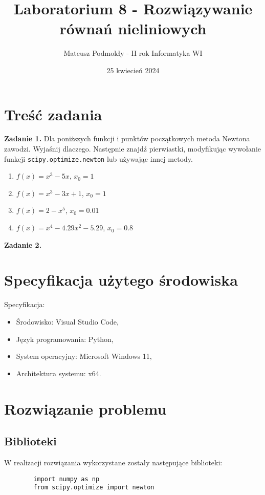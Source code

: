 \documentclass[11pt, leqno]{scrartcl}
\title{Laboratorium 8 - Rozwiązywanie równań nieliniowych}
\author{Mateusz Podmokły - II rok Informatyka WI}
\date{25 kwiecień 2024}
\begin{document}
    \maketitle
    \section{Treść zadania}
    \textbf{Zadanie 1.} Dla poniższych funkcji i punktów początkowych
    metoda Newtona zawodzi. Wyjaśnij dlaczego. Następnie znajdź
    pierwiastki, modyfikując wywołanie funkcji
    \texttt{scipy.optimize.newton} lub używając innej metody.
    \begin{enumerate}
        \item $f(x)=x^3-5x$, $x_0=1$
        \item $f(x)=x^3-3x+1$, $x_0=1$
        \item $f(x)=2-x^5$, $x_0=0.01$
        \item $f(x)=x^4-4.29x^2-5.29$, $x_0=0.8$
    \end{enumerate}
    \textbf{Zadanie 2.}

    \section{Specyfikacja użytego środowiska}
    Specyfikacja:

    \begin{itemize}
        \item Środowisko: Visual Studio Code,
        \item Język programowania: Python,
        \item System operacyjny: Microsoft Windows 11,
        \item Architektura systemu: x64.
    \end{itemize}

    \section{Rozwiązanie problemu}
    \subsection{Biblioteki}
    W realizacji rozwiązania wykorzystane zostały następujące
    biblioteki:
    \begin{lstlisting}
        import numpy as np
        from scipy.optimize import newton
    \end{lstlisting}
\end{document}
